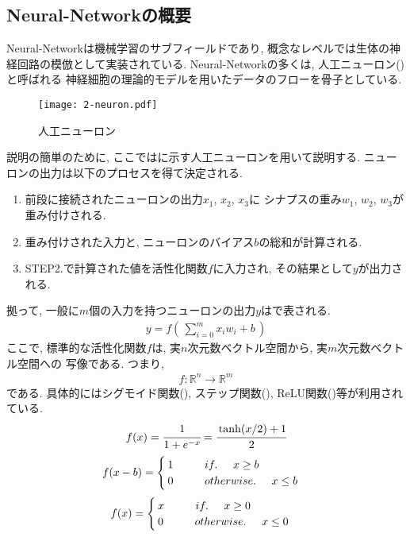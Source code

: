 \subsection*{Neural-Networkの概要}
Neural-Networkは機械学習のサブフィールドであり, 
概念なレベルでは生体の神経回路の模倣として実装されている.
Neural-Networkの多くは, 人工ニューロン()と呼ばれる
神経細胞の理論的モデルを用いたデータのフローを骨子としている.
\begin{figure}[H]
  \centering
  \texttt{[image: 2-neuron.pdf]}
  \caption{人工ニューロン}
  \label{fig:人工ニューロン}
\end{figure}
説明の簡単のために, 
ここではに示す人工ニューロンを用いて説明する.
ニューロンの出力は以下のプロセスを得て決定される.
\begin{enumerate}[STEP 1.]
  \item 前段に接続されたニューロンの出力$x_1$, $x_2$, $x_3$に
  シナプスの重み$w_1$, $w_2$, $w_3$が重み付けされる.
  \item 重み付けされた入力と, ニューロンのバイアス$b$の総和が計算される.
  \item STEP2.で計算された値を活性化関数$f$に入力され, その結果として$y$が出力される.
\end{enumerate}
拠って, 一般に$m$個の入力を持つニューロンの出力$y$はで表される.
\begin{align}
  y=f(\,\displaystyle\sum_{i=0}^{m} x_iw_i+b\,)
  \label{eq:ニューロンの出力}
\end{align}
ここで, 標準的な活性化関数$f$は, 実$n$次元数ベクトル空間から, 実$m$次元数ベクトル空間への
写像である. つまり, 
\begin{align}
  f: \mathbb{R}^n\rightarrow\mathbb{R}^m
\end{align}
である.
具体的にはシグモイド関数(), 
ステップ関数(), 
ReLU関数()等が利用されている.
\begin{align}
  f(x)=\displaystyle \cfrac{1}{1+e^{-x}}=\cfrac{\tanh(x/2)+1}{2}
  \label{eq:シグモイド}
\end{align}
\begin{align}
  f(x-b)=
  \displaystyle
  \begin{cases}
    1 \hspace{1cm}if. \hspace{0.5cm}x\geq b\\
    0\hspace{1cm}otherwise. \hspace{0.5cm}x\leq b
  \end{cases}
  \label{eq:ステップ}
\end{align}
\begin{align}
f(x)=
\displaystyle
\begin{cases}
  x \hspace{1cm}if. \hspace{0.5cm}x\geq 0\\
  0\hspace{1cm}otherwise. \hspace{0.5cm}x\leq 0
\end{cases}
\label{eq:ReLU}
\end{align}

